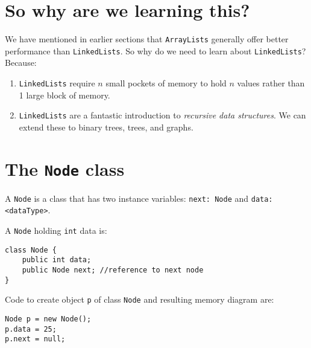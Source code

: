 \def\topic{Linked Lists}

 
\section{So why are we learning this?}

We have mentioned in earlier sections that \texttt{ArrayLists} generally offer better performance than \texttt{LinkedLists}. So why do we need to learn about \texttt{LinkedLists}? Because:

\begin{enumerate}
\item \texttt{LinkedLists} require $n$ small pockets of memory to hold $n$ values rather than 1 large block of memory.
\item \texttt{LinkedLists} are a fantastic introduction to \textit{recursive data structures}. We can extend these to binary trees, trees, and graphs.
\end{enumerate}

\section{The \texttt{Node} class}

A \texttt{Node} is a class that has two instance variables: \texttt{next: Node} and \texttt{data: <dataType>}. 

A \texttt{Node} holding \texttt{int} data is:

\begin{lstlisting}
class Node {
	public int data;
	public Node next; //reference to next node
}
\end{lstlisting}

Code to create object \texttt{p} of class \texttt{Node} and resulting memory diagram are:

\begin{lstlisting}
Node p = new Node();
p.data = 25;
p.next = null;
\end{lstlisting}


\begin{center}
\end{center}

